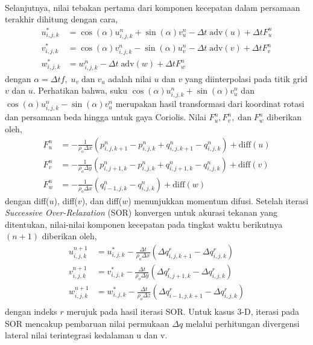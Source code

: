 \begin{spacing}{1.5}
\begin{equation*}
\begin{aligned}
		\end{aligned}
	\end{equation*}
	Selanjutnya, nilai tebakan pertama dari komponen kecepatan dalam persamaan terakhir dihitung dengan cara,
	\begin{equation}
		\begin{aligned}
			u_{i,j,k}^{*} &= \cos(\alpha)u_{i,j,k}^{n}+\sin(\alpha)v_{u}^{n} - \Delta t \; \text{adv}(u) + \Delta t F_{u}^{n}\\
			v_{i,j,k}^{*} &= \cos(\alpha)v_{i,j,k}^{n}-\sin(\alpha)u_{v}^{n} - \Delta t \; \text{adv}(v) + \Delta t F_{v}^{n}\\
			w_{i,j,k}^{*} &= w_{i,j,k}^{n} - \Delta t \; \text{adv}(w) + \Delta t F_{w}^{n}
		\end{aligned}
	\end{equation}
	dengan $\alpha = \Delta tf, \; u_v \;\text{dan}\;v_u$ adalah nilai $u$ dan $v$ yang diinterpolasi pada titik grid $v$ dan $u$. Perhatikan bahwa, suku $\cos(\alpha)u_{i,j,k}^{n}+\sin(\alpha)v_{u}^{n}$ dan $\cos(\alpha)u_{i,j,k}^{n}-\sin(\alpha)v_{u}^{n}$ merupakan hasil transformasi dari koordinat rotasi dan persamaan beda hingga untuk gaya Coriolis. Nilai $F_{u}^{n}, F_{v}^{n},\;\text{dan}\;F_{w}^{n}$ diberikan oleh,
	\begin{equation}
		\begin{aligned}
			F_{u}^{n} &=-\frac{1}{\rho_o \Delta x}(p_{i,j,k+1}^{n}-p_{i,j,k}^{n}+q_{i,j,k+1}^{n}-q_{i,j,k}^{n})+\text{diff}(u)\\
			F_{v}^{n} &=-\frac{1}{\rho_o \Delta y}(p_{i,j+1,k}^{n}-p_{i,j,k}^{n}+q_{i,j+1,k}^{n}-q_{i,j,k}^{n})+\text{diff}(v)\\
			F_{w}^{n} &=-\frac{1}{\rho_o \Delta x}(q_{i-1,j,k}^{n}-q_{i,j,k}^{n})+\text{diff}(w)
		\end{aligned}
	\end{equation}
	dengan diff($u$), diff($v$), dan diff($w$) menunjukkan momentum difusi. Setelah iterasi \textit{Successive Over-Relaxation} (SOR) konvergen untuk akurasi tekanan yang ditentukan, nilai-nilai komponen kecepatan pada tingkat waktu berikutnya $(n+1)$ diberikan oleh,
	\begin{equation}
		\begin{aligned}
			u_{i,j,k}^{n+1} &= u_{i,j,k}^{*}-\frac{\Delta t}{\rho_o \Delta x}(\Delta q_{i,j,k+1}^{r} - \Delta q_{i,j,k}^{r})\\
			v_{i,j,k}^{n+1} &= v_{i,j,k}^{*}-\frac{\Delta t}{\rho_o \Delta y}(\Delta q_{i,j+1,k}^{r} - \Delta q_{i,j,k}^{r})\\
			w_{i,j,k}^{n+1} &= w_{i,j,k}^{*}-\frac{\Delta t}{\rho_o \Delta z}(\Delta q_{i-1,j,k+1}^{r} - \Delta q_{i,j,k}^{r})\\
		\end{aligned}
	\end{equation}
	dengan indeks $r$ merujuk pada hasil iterasi SOR. Untuk kasus 3-D, iterasi pada SOR mencakup pembaruan nilai permukaan $\Delta q$ melalui perhitungan divergensi lateral nilai terintegrasi kedalaman u dan v.

\end{spacing}
